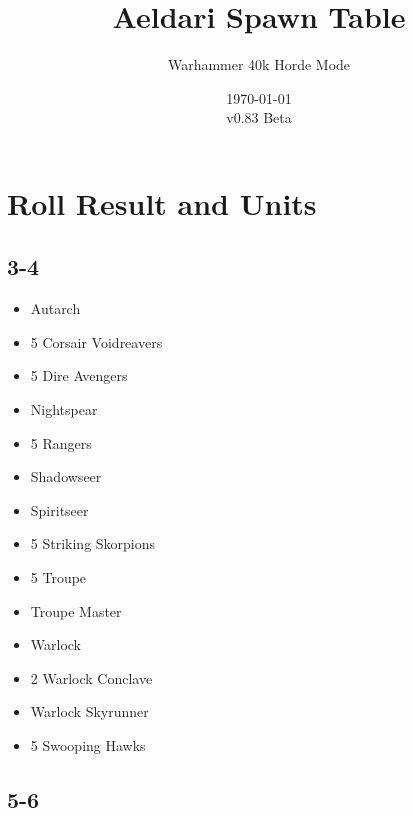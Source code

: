 \documentclass{HordeModeTarot}
\title{Aeldari Spawn Table}
\author{Warhammer 40k Horde Mode}
\date{\today \\v0.83 Beta}
\begin{document}
\maketitle

\outputUsingSpawnTableBoilerplate
\section{Roll Result and Units}\hypertarget{roll-results}{}\label{roll-results}

\begin{multicols}{2}

\subsection*{3-4}

\begin{itemize}[leftmargin=*]
\item[] Autarch
\item[] 5 Corsair Voidreavers
\item[] 5 Dire Avengers
\item[] Nightspear
\item[] 5 Rangers
\item[] Shadowseer
\item[] Spiritseer
\item[] 5 Striking Skorpions
\item[] 5 Troupe
\item[] Troupe Master
\item[] Warlock
\item[] 2 Warlock Conclave
\item[] Warlock Skyrunner
\item[] 5 Swooping Hawks
\end{itemize}

\subsection*{5-6}


\end{multicols}
\end{document}
